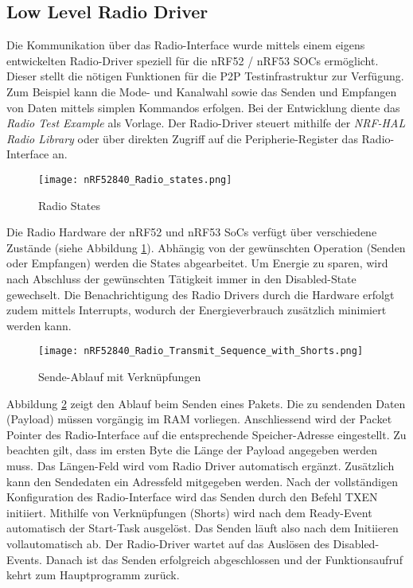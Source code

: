 \subsection{Low Level Radio Driver}\label{sec:LowLevelRadioDriver}

Die Kommunikation über das Radio-Interface wurde mittels einem eigens entwickelten Radio-Driver speziell für die nRF52 / nRF53 SOCs ermöglicht. Dieser stellt die nötigen Funktionen für die P2P Testinfrastruktur zur Verfügung. Zum Beispiel kann die Mode- und Kanalwahl sowie das Senden und Empfangen von Daten mittels simplen Kommandos erfolgen. Bei der Entwicklung diente das \textit{Radio Test Example} \cite{nrf_connect_sdk_radio_test_example_2020} als Vorlage. Der Radio-Driver steuert mithilfe der \textit{NRF-HAL Radio Library} oder über direkten Zugriff auf die Peripherie-Register das Radio-Interface an.

\begin{figure} [H]
	\centering
	\texttt{[image: nRF52840\_Radio\_states.png]}
	\caption{Radio States \cite{nordic_semi_nrf_infocenter_radio_states_2020}}
	\label{fig:RadioStatesP2P}
\end{figure}

Die Radio Hardware der nRF52 und nRF53 SoCs verfügt über verschiedene Zustände (siehe Abbildung \ref{fig:RadioStatesP2P}). Abhängig von der gewünschten Operation (Senden oder Empfangen) werden die States abgearbeitet.
Um Energie zu sparen, wird nach Abschluss der gewünschten Tätigkeit immer in den Disabled-State gewechselt.
Die Benachrichtigung des Radio Drivers durch die Hardware erfolgt zudem mittels Interrupts, wodurch der Energieverbrauch zusätzlich minimiert werden kann.

\begin{figure} [H]
	\centering
	\texttt{[image: nRF52840\_Radio\_Transmit\_Sequence\_with\_Shorts.png]}
	\caption{Sende-Ablauf mit Verknüpfungen \cite{nordic_semi_nrf_infocenter_radio_transmit_sequence_2020}}
	\label{fig:RadioTransmitSequP2P}
\end{figure}

Abbildung \ref{fig:RadioTransmitSequP2P} zeigt den Ablauf beim Senden eines Pakets. Die zu sendenden Daten (Payload) müssen vorgängig im RAM vorliegen.
Anschliessend wird der Packet Pointer des Radio-Interface auf die entsprechende Speicher-Adresse eingestellt.
Zu beachten gilt, dass im ersten Byte die Länge der Payload angegeben werden muss.
Das Längen-Feld wird vom Radio Driver automatisch ergänzt.
Zusätzlich kann den Sendedaten ein Adressfeld mitgegeben werden. Nach der vollständigen Konfiguration des Radio-Interface wird das Senden durch den Befehl TXEN initiiert. Mithilfe von Verknüpfungen (Shorts) wird nach dem Ready-Event automatisch der Start-Task ausgelöst.
Das Senden läuft also nach dem Initiieren vollautomatisch ab.
Der Radio-Driver wartet auf das Auslösen des Disabled-Events.
Danach ist das Senden erfolgreich abgeschlossen und der Funktionsaufruf kehrt zum Hauptprogramm zurück.


